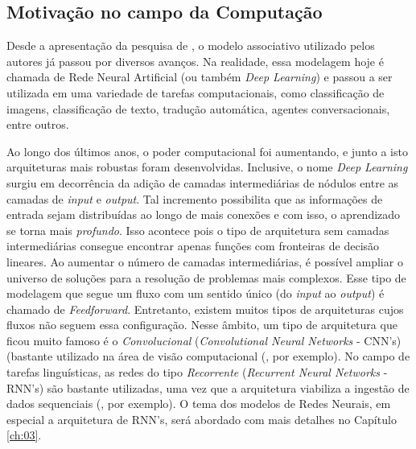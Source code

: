 \subsection{Motivação no campo da Computação}
\label{sec:compmot}

Desde a apresentação da pesquisa de \cite{rumelhart:1986}, o modelo associativo utilizado pelos autores já passou por diversos avanços. Na realidade, essa modelagem hoje é chamada de Rede Neural Artificial (ou também \textit{Deep Learning}) e passou a ser utilizada em uma variedade de tarefas computacionais, como classificação de imagens, classificação de texto, tradução automática, agentes conversacionais, entre outros. 

Ao longo dos últimos anos, o poder computacional foi aumentando, e junto a isto arquiteturas mais robustas foram desenvolvidas. Inclusive, o nome \textit{Deep Learning} surgiu em decorrência da adição de camadas intermediárias de nódulos entre as camadas de \textit{input} e \textit{output}. Tal incremento possibilita que as informações de entrada sejam distribuídas ao longo de mais conexões e com isso, o aprendizado se torna mais \textit{profundo}. Isso acontece pois o tipo de arquitetura sem camadas intermediárias consegue encontrar apenas funções com fronteiras de decisão lineares. Ao aumentar o número de camadas intermediárias, é possível ampliar o universo de soluções para a resolução de problemas mais complexos. Esse tipo de modelagem que segue um fluxo com um sentido único (do \textit{input} ao \textit{output}) é chamado de \textit{Feedforward}. Entretanto, existem muitos tipos de arquiteturas cujos fluxos não seguem essa configuração. Nesse âmbito, um tipo de arquitetura que ficou muito famoso é o \textit{Convolucional} (\textit{Convolutional Neural Networks} - CNN's) (bastante utilizado na área de visão computacional (\cite{Krizhevsky:2012}, por exemplo). No campo de tarefas linguísticas, as redes do tipo \textit{Recorrente} (\textit{Recurrent Neural Networks} - RNN's) são bastante utilizadas, uma vez que a arquitetura viabiliza a ingestão de dados sequenciais  (\cite{pengfei:2016}, por exemplo). O tema dos modelos de Redes Neurais, em especial a arquitetura de RNN's, será abordado com mais detalhes no Capítulo \ref{ch:03}.

